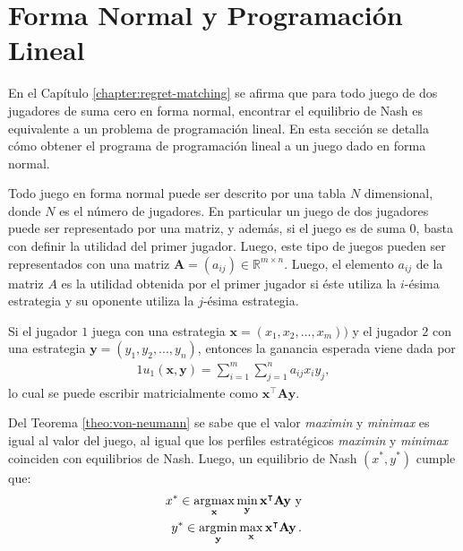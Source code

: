 \chapter{Forma Normal y Programación Lineal}
\label{apex:chapter:programacion-lineal}

En el Capítulo \ref{chapter:regret-matching} se afirma que para todo juego de dos jugadores de suma cero en forma normal, encontrar el equilibrio de Nash es equivalente a un problema de programación lineal. En esta sección se detalla cómo obtener el programa de programación lineal a un juego dado en forma normal.

Todo juego en forma normal puede ser descrito por una tabla $N$ dimensional, donde $N$ es el número de jugadores. En particular un juego de dos jugadores puede ser representado por una matriz, y además, si el juego es de suma $0$, basta con definir la utilidad del primer jugador. Luego, este tipo de juegos pueden ser representados con una matriz $\mathbf{A} = (a_{ij}) \in \mathbb{R}^{m \times n}$. Luego, el elemento $a_{ij}$ de la matriz $A$ es la utilidad obtenida por el primer jugador si éste utiliza la $i$-ésima estrategia y su oponente utiliza la $j$-ésima estrategia.

Si el jugador $1$ juega con una estrategia $ \mathbf{x} = (x_1, x_2, ..., x_m))$ y el jugador $2$ con una estrategia $\mathbf{y} = (y_1, y_2, ..., y_n)$, entonces la ganancia esperada viene dada por
\begin{alignat}{1}
u_1(\mathbf{x}, \mathbf{y}) = \sum_{i = 1}^m \sum_{j = 1}^n a_{ij}x_iy_j,
\end{alignat}
lo cual se puede escribir matricialmente como $\mathbf{x}^\intercal \mathbf{A} \mathbf{y}$.

Del Teorema \ref{theo:von-neumann} se sabe que el valor \textit{maximin} y \textit{minimax} es igual al valor del juego, al igual que los perfiles estratégicos \textit{maximin} y \textit{minimax} coinciden con equilibrios de Nash. Luego, un equilibrio de Nash $(x^*, y^*)$ cumple que:
\begin{alignat}{1}
x^* \in \operatorname*{\arg\!\max}_{\mathbf{x}}{\min_{\mathbf{y}}{\mathbf{x}^\intercal \mathbf{A} \mathbf{y}}} \ \text{y} \label{apex:eq:maximin} \\
y^* \in \operatorname*{\arg\!\min}_{\mathbf{y}}{\max_{\mathbf{x}}{\mathbf{x}^\intercal \mathbf{A} \mathbf{y}}} \,.
\label{apex:eq:minimax}
\end{alignat}

